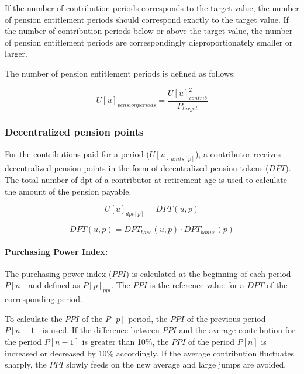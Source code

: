 If the number of contribution periods corresponds to the target value, the number of pension entitlement periods should correspond exactly to the target value. If the number of contribution periods below or above the target value, the number of pension entitlement periods are correspondingly disproportionately smaller or larger.  

The number of pension entitlement periods is defined as follows:

\begin{equation}
U[u]_{pensionperiods} = \frac{U[u]_{contrib}^2}{P_{target}}
\end{equation}


\subsubsection{Decentralized pension points}


For the contributions paid for a period ($U[u]_{units[p]}$), a contributor receives decentralized pension points in the form of decentralized pension tokens ($DPT$). The total number of \gls{dpt} of a contributor at retirement age is used to calculate the amount of the pension payable.

\begin{equation}
U[u]_{dpt[p]} = DPT(u, p)
\end{equation}

\begin{equation}
DPT(u, p) = DPT_{base}(u, p) \cdot DPT_{bonus}(p)
\end{equation}

\paragraph*{Purchasing Power Index:}


The purchasing power index ($PPI$) is calculated at the beginning of each period $P[n]$ and defined as $P[p]_{ppi}$. The $PPI$ is the reference value for a $DPT$ of the corresponding period.

To calculate the $PPI$ of the $P[p]$ period, the $PPI$ of the previous period $P[n-1]$ is used.
If the difference between $PPI$ and the average contribution for the period $P[n-1]$ is greater than 10\%, the $PPI$ of the period $P[n]$ is increased or decreased by 10\% accordingly.
If the average contribution fluctuates sharply, the $PPI$ slowly feeds on the new average and large jumps are avoided.

